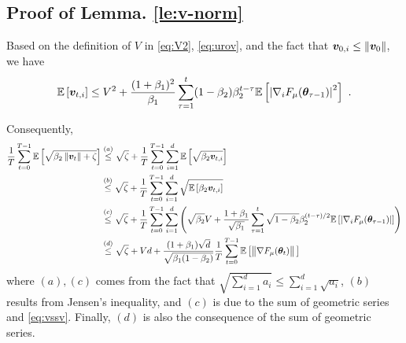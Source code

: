 \begin{appendices}
\subsection{Proof of Lemma. \ref{le:v-norm}}\label{proof:v-norm}

Based on the definition of $V$ in \eqref{eq:V2}, \eqref{eq:urov}, and the fact that ${\bm{v}}_{0,i} \leq \left\|{\bm{v}}_0\right\|$, we have
\begin{equation}
\begin{aligned}
\mathbb{E}\left[ {\bm{v}}_{t,i}\right] \leq V^2 + \frac{(1+\beta_1)^2}{\beta_1}\sum_{\tau=1}^{t}(1-\beta_2)\beta_2^{t-\tau}\mathbb{E}\left[\left|\nabla_i F_{\mu}({\bm{\theta}}_{\tau-1})\right|^2\right] \ . \label{eq:vssv}
\end{aligned}
\end{equation}

Consequently,
\begin{equation}
\begin{aligned}
\frac{1}{T}\sum_{t=0}^{T-1} \mathbb{E}\left[\sqrt{\beta_2\left\|{\bm{v}}_{t}\right\|+\zeta}\right] &\stackrel{(a)}{\leq} \sqrt{\zeta} + \frac{1}{T}\sum_{t=0}^{T-1}\sum_{i=1}^d \mathbb{E}\left[\sqrt{\beta_2{\bm{v}}_{t,i}}\right] \\
&\stackrel{(b)}{\leq} \sqrt{\zeta} + \frac{1}{T}\sum_{t=0}^{T-1}\sum_{i=1}^d \sqrt{\mathbb{E}\left[\beta_2{\bm{v}}_{t,i}\right]} \\
&\stackrel{(c)}{\leq} \sqrt{\zeta} + \frac{1}{T}\sum_{t=0}^{T-1}\sum_{i=1}^d \left(\sqrt{\beta_2}V + \frac{1+\beta_1}{\sqrt{\beta_1}}\sum_{\tau=1}^{t}\sqrt{1-\beta_2}\beta_2^{(t-\tau)/2}\mathbb{E}\left[\left|\nabla_i F_{\mu}({\bm{\theta}}_{\tau-1})\right| \right]\right) \\
&\stackrel{(d)}{\leq} \sqrt{\zeta} + Vd + \frac{(1+\beta_1)\sqrt{d}}{\sqrt{\beta_1(1-\beta_2)}} \frac{1}{T} \sum_{t=0}^{T-1} \mathbb{E}\left[\big\|\nabla F_{\mu}({\bm{\theta}}_t)\right\|\big] \label{eq:jenv}
\end{aligned}
\end{equation}
where $(a),(c)$ comes from the fact that $\sqrt{\sum_{i=1}^d a_i} \leq \sum_{i=1}^d\sqrt{a_i}$, $(b)$ results from Jensen's inequality, and $(c)$ is due to the sum of geometric series and \eqref{eq:vssv}. Finally, $(d)$ is also the consequence of the sum of geometric series.


\end{appendices}
